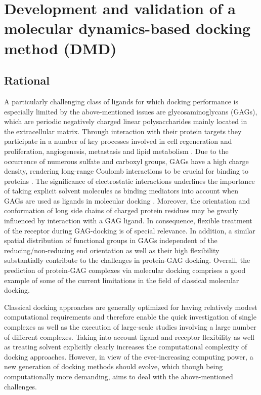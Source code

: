 \chapter{Development and validation of a molecular dynamics-based docking method (DMD)}
\section{Rational}
A particularly challenging class of ligands for which docking performance is
especially limited by the above-mentioned issues are glycosaminoglycans
(GAGs), which are periodic negatively charged linear polysaccharides mainly located
in the extracellular matrix. Through interaction with their protein targets
they participate
in a number of key processes involved in cell regeneration and proliferation,
angiogenesis, metastasis and lipid metabolism \cite{hynes_extracellular_2009,
macri_growth_2007, barbero_chembiochem_2013}. Due to the occurrence of
numerous sulfate and carboxyl groups, GAGs have a high
charge density, rendering long-range Coulomb interactions to
be crucial for binding to proteins \cite{mulloy_specificity_2005}. The
significance of electrostatic interactions underlines the importance
of taking explicit solvent molecules as binding mediators into account when GAGs
are used as ligands in molecular docking \cite{samsonov_docking_2011}. Moreover,
the orientation and conformation of long side chains of charged protein residues
may be greatly influenced by interaction with a GAG ligand. In consequence, flexible
treatment of the receptor during GAG-docking is of special relevance.
In addition, a similar spatial distribution of functional groups in GAGs independent of the
reducing/non-reducing end orientation \cite{forster_computational_2006} as well as their
high flexibility \cite{bitomsky_docking_1999} substantially contribute to
the challenges in protein-GAG docking. Overall, the prediction of protein-GAG complexes
via molecular docking comprises a good example of some of the current limitations
in the field of classical molecular docking.

Classical docking approaches are generally optimized for having relatively modest computational
requirements and therefore enable the quick
investigation of single complexes as well as the execution of large-scale
studies involving a large number of different complexes. Taking into account
ligand and receptor flexibility as well as treating solvent explicitly clearly
increases the computational complexity of docking approaches. However, in view of the
ever-increasing computing power, a new generation of docking methods should
evolve, which though being computationally more demanding, aims to deal
with the above-mentioned challenges.

